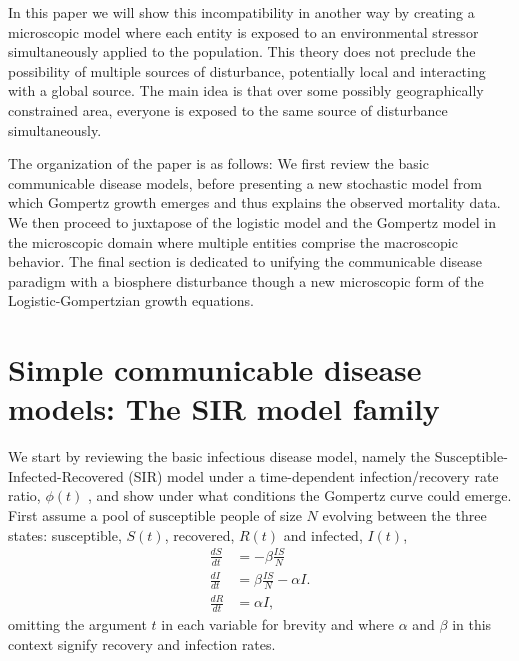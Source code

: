 \documentclass{article}
\begin{document}
In this paper we will show this incompatibility in another way by creating a microscopic model where each entity is exposed to an environmental stressor simultaneously applied to the population. This theory does not preclude the possibility of multiple sources of disturbance, potentially local and interacting with a global source. The main idea is that over some possibly geographically constrained area, everyone is exposed to the same source of disturbance simultaneously.

The organization of the paper is as follows: We first review the basic communicable disease models, before presenting a new stochastic model from which Gompertz growth emerges and thus explains the observed mortality data. We then proceed to juxtapose of the logistic model and the Gompertz model in the microscopic domain where multiple entities comprise the macroscopic behavior. The final section is dedicated to unifying the communicable disease paradigm with a biosphere disturbance though a new microscopic form of the Logistic-Gompertzian growth equations.

\section*{Simple communicable disease models: The SIR model family}
We start by reviewing the basic infectious disease model, namely the Susceptible-Infected-Recovered (SIR) model under a time-dependent infection/recovery rate ratio, $\phi(t)$ \cite{kermack1927contribution}, and show under what conditions the Gompertz curve could emerge. First assume a pool of susceptible people of size $N$ evolving between the three states: susceptible, $S(t)$, recovered, $R(t)$ and infected, $I(t)$,
\begin{align}
\label{eq:SIR}
\frac{dS}{dt}& = -\beta \frac{IS}{N}\nonumber\\
\frac{dI}{dt}& = \beta \frac{IS}{N} - \alpha I.\\
\frac{dR}{dt}& = \alpha I\nonumber,
\end{align}
omitting the argument $t$ in each variable for brevity and where $\alpha$ and $\beta$ in this context signify recovery and infection rates.
\end{document}
